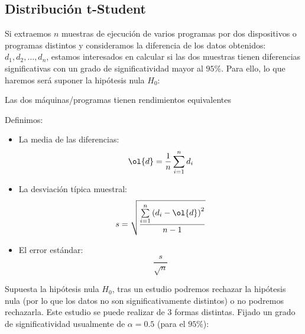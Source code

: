 \subsection{Distribución t-Student}
Si extraemos $n$ muestras de ejecución de varios programas por dos dispositivos o programas distintos y consideramos la diferencia de los datos obtenidos: $d_1,d_2,\ldots,d_n$, estamos interesados en calcular si las dos muestras tienen diferencias significativas con un grado de significatividad mayor al $95\%$. Para ello, lo que haremos será suponer la hipótesis nula $H_0$:
\begin{center}
    Las dos máquinas/programas tienen rendimientos equivalentes
\end{center}
Definimos:
\begin{itemize}
    \item La media de las diferencias:
        \begin{equation*}
            \ol{d} = \dfrac{1}{n}\sum_{i=1}^{n}d_i
        \end{equation*}
    \item La desviación típica muestral:
        \begin{equation*}
            s = \sqrt{\dfrac{\sum\limits_{i=1}^{n}{(d_i - \ol{d})}^{2}}{n-1}}
        \end{equation*}
    \item El error estándar:
        \begin{equation*}
            \dfrac{s}{\sqrt{n}}
        \end{equation*}
\end{itemize}
Supuesta la hipótesis nula $H_0$, tras un estudio podremos rechazar la hipótesis nula (por lo que los datos no son significativamente distintos) o no podremos rechazarla. Este estudio se puede realizar de 3 formas distintas. Fijado un grado de significatividad usualmente de $\alpha=0.5$ (para el $95\%$):
